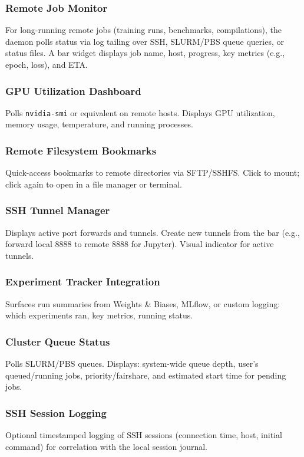 \documentclass[11pt,a4paper]{article}
\begin{document}
\subsubsection{Remote Job Monitor}
For long-running remote jobs (training runs, benchmarks, compilations), the daemon polls status via log tailing over SSH, SLURM/PBS queue queries, or status files. A bar widget displays job name, host, progress, key metrics (e.g., epoch, loss), and ETA.

\subsubsection{GPU Utilization Dashboard}
Polls \texttt{nvidia-smi} or equivalent on remote hosts. Displays GPU utilization, memory usage, temperature, and running processes.

\subsubsection{Remote Filesystem Bookmarks}
Quick-access bookmarks to remote directories via SFTP/SSHFS. Click to mount; click again to open in a file manager or terminal.

\subsubsection{SSH Tunnel Manager}
Displays active port forwards and tunnels. Create new tunnels from the bar (e.g., forward local 8888 to remote 8888 for Jupyter). Visual indicator for active tunnels.

\subsubsection{Experiment Tracker Integration}
Surfaces run summaries from Weights \& Biases, MLflow, or custom logging: which experiments ran, key metrics, running status.

\subsubsection{Cluster Queue Status}
Polls SLURM/PBS queues. Displays: system-wide queue depth, user's queued/running jobs, priority/fairshare, and estimated start time for pending jobs.

\subsubsection{SSH Session Logging}
Optional timestamped logging of SSH sessions (connection time, host, initial command) for correlation with the local session journal.
\end{document}
